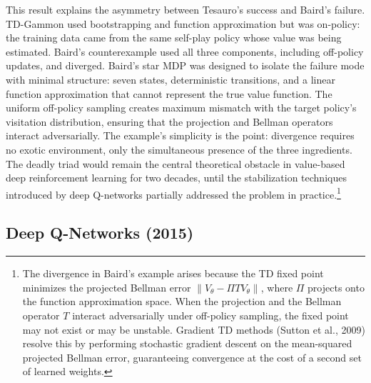 This result explains the asymmetry between Tesauro's success and Baird's failure. TD-Gammon used bootstrapping and function approximation but was on-policy: the training data came from the same self-play policy whose value was being estimated. Baird's counterexample used all three components, including off-policy updates, and diverged. Baird's star MDP was designed to isolate the failure mode with minimal structure: seven states, deterministic transitions, and a linear function approximation that cannot represent the true value function. The uniform off-policy sampling creates maximum mismatch with the target policy's visitation distribution, ensuring that the projection and Bellman operators interact adversarially. The example's simplicity is the point: divergence requires no exotic environment, only the simultaneous presence of the three ingredients. The deadly triad would remain the central theoretical obstacle in value-based deep reinforcement learning for two decades, until the stabilization techniques introduced by deep Q-networks partially addressed the problem in practice.\footnote{The divergence in Baird's example arises because the TD fixed point minimizes the projected Bellman error $\|V_\theta - \Pi T V_\theta\|$, where $\Pi$ projects onto the function approximation space. When the projection and the Bellman operator $T$ interact adversarially under off-policy sampling, the fixed point may not exist or may be unstable. Gradient TD methods (Sutton et al., 2009) resolve this by performing stochastic gradient descent on the mean-squared projected Bellman error, guaranteeing convergence at the cost of a second set of learned weights.}

\subsection{Deep Q-Networks (2015)}

